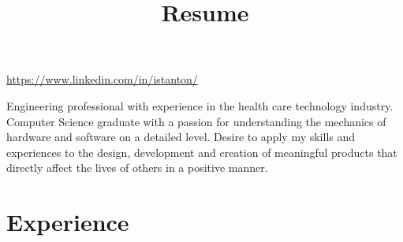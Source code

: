 \documentclass[]{deedy-resume-openfont}
\begin{document}
\title{Resume}
%
%

%
%
\vspace{10pt}

\href{https://www.linkedin.com/in/istanton/}{https://www.linkedin.com/in/istanton/}

\vspace{\topsep}
Engineering professional with experience in the health care technology industry. Computer Science graduate with a passion for understanding the mechanics of hardware and software on a detailed level. Desire to apply my skills and experiences to the design, development and creation of meaningful products that directly affect the lives of others in a positive manner.

\section{Experience}
\end{document}
